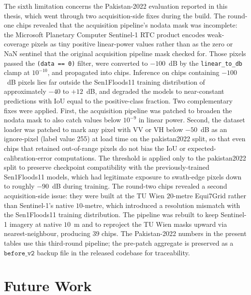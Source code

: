 \documentclass[11pt,a4paper,oneside]{report}
\begin{document}
The sixth limitation concerns the Pakistan-2022 evaluation reported in this thesis, which went through two acquisition-side fixes during the build. The round-one chips revealed that the acquisition pipeline's nodata mask was incomplete: the Microsoft Planetary Computer Sentinel-1 RTC product encodes weak-coverage pixels as tiny positive linear-power values rather than as the zero or NaN sentinel that the original acquisition pipeline mask checked for. Those pixels passed the \texttt{(data == 0)} filter, were converted to $-100$~dB by the \texttt{linear\_to\_db} clamp at $10^{-10}$, and propagated into chips. Inference on chips containing $-100$~dB pixels lies far outside the Sen1Floods11 training distribution of approximately $-40$ to $+12$~dB, and degraded the models to near-constant predictions with IoU equal to the positive-class fraction. Two complementary fixes were applied. First, the acquisition pipeline was patched to broaden the nodata mask to also catch values below $10^{-9}$ in linear power. Second, the dataset loader was patched to mark any pixel with VV or VH below $-50$~dB as an ignore-pixel (label value 255) at load time on the pakistan2022 split, so that even chips that retained out-of-range pixels do not bias the IoU or expected-calibration-error computations. The threshold is applied only to the pakistan2022 split to preserve checkpoint compatibility with the previously-trained Sen1Floods11 models, which had legitimate exposure to swath-edge pixels down to roughly $-90$~dB during training. The round-two chips revealed a second acquisition-side issue: they were built at the TU Wien $20$-metre Equi7Grid rather than Sentinel-1's native $10$-metre, which introduced a resolution mismatch with the Sen1Floods11 training distribution. The pipeline was rebuilt to keep Sentinel-1 imagery at native $10$~m and to reproject the TU Wien masks upward via nearest-neighbour, producing $39$ chips. The Pakistan-2022 numbers in the present tables use this third-round pipeline; the pre-patch aggregate is preserved as a $\texttt{before\_v2}$ backup file in the released codebase for traceability.

\section{Future Work}
\end{document}
